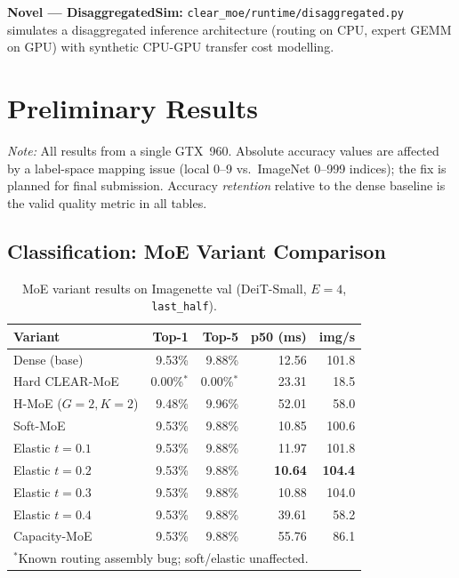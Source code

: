 \documentclass[conference]{IEEEtran}
\begin{document}
\textbf{Novel --- DisaggregatedSim:}
\texttt{clear\_moe/runtime/disaggregated.py} simulates a disaggregated
inference architecture (routing on CPU, expert GEMM on GPU) with
synthetic CPU-GPU transfer cost modelling.

\section{Preliminary Results}
\label{sec:results}

\textit{Note:} All results from a single GTX~960.
Absolute accuracy values are affected by a label-space mapping issue
(local 0--9 vs.\ ImageNet 0--999 indices); the fix is planned for final
submission. Accuracy \emph{retention} relative to the dense baseline
is the valid quality metric in all tables.

\subsection{Classification: MoE Variant Comparison}

\begin{table}[htbp]
\caption{MoE variant results on Imagenette val (DeiT-Small,
$E{=}4$, \texttt{last\_half}).}
\label{tab:moe}
\centering
\scriptsize
\begin{tabular}{lrrrr}
\toprule
\textbf{Variant} & \textbf{Top-1} & \textbf{Top-5} & \textbf{p50 (ms)} & \textbf{img/s} \\
\midrule
Dense (base)           & 9.53\% & 9.88\% & 12.56 & 101.8 \\
Hard CLEAR-MoE         & 0.00\%$^*$ & 0.00\%$^*$ & 23.31 & 18.5 \\
H-MoE ($G{=}2,K{=}2$) & 9.48\% & 9.96\% & 52.01 & 58.0 \\
Soft-MoE               & 9.53\% & 9.88\% & 10.85 & 100.6 \\
Elastic $t{=}0.1$      & 9.53\% & 9.88\% & 11.97 & 101.8 \\
Elastic $t{=}0.2$      & 9.53\% & 9.88\% & \textbf{10.64} & \textbf{104.4} \\
Elastic $t{=}0.3$      & 9.53\% & 9.88\% & 10.88 & 104.0 \\
Elastic $t{=}0.4$      & 9.53\% & 9.88\% & 39.61 & 58.2 \\
Capacity-MoE           & 9.53\% & 9.88\% & 55.76 & 86.1 \\
\midrule
\multicolumn{5}{l}{$^*$Known routing assembly bug; soft/elastic unaffected.}\\
\end{tabular}
\end{table}
\end{document}
